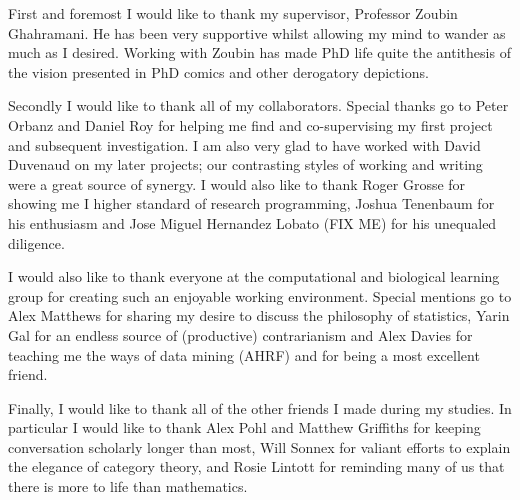 
\begin{acknowledgements}      

First and foremost I would like to thank my supervisor, Professor Zoubin Ghahramani.
He has been very supportive whilst allowing my mind to wander as much as I desired.
Working with Zoubin has made PhD life quite the antithesis of the vision presented in PhD comics and other derogatory depictions.

Secondly I would like to thank all of my collaborators.
Special thanks go to Peter Orbanz and Daniel Roy for helping me find and co-supervising my first project and subsequent investigation.
I am also very glad to have worked with David Duvenaud on my later projects; our contrasting styles of working and writing were a great source of synergy.
I would also like to thank Roger Grosse for showing me I higher standard of research programming, Joshua Tenenbaum for his enthusiasm and Jose Miguel Hernandez Lobato (FIX ME) for his unequaled diligence.

I would also like to thank everyone at the computational and biological learning group for creating such an enjoyable working environment.
Special mentions go to Alex Matthews for sharing my desire to discuss the philosophy of statistics, Yarin Gal for an endless source of (productive) contrarianism and Alex Davies for teaching me the ways of data mining (AHRF) and for being a most excellent friend.

Finally, I would like to thank all of the other friends I made during my studies.
In particular I would like to thank Alex Pohl and Matthew Griffiths for keeping conversation scholarly longer than most, Will Sonnex for valiant efforts to explain the elegance of category theory, and Rosie Lintott for reminding many of us that there is more to life than mathematics.

\end{acknowledgements}

